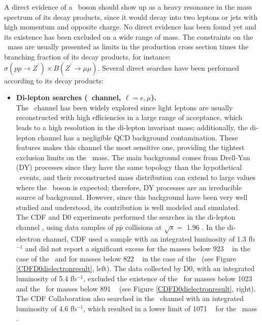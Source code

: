\noindent A direct evidence of a \Zprime~boson should show up as a heavy resonance in 
the mass spectrum of its decay products, since it would decay into two leptons or jets
with high momentum and opposite charge. No direct evidence has 
been found yet and its existence has been excluded on a wide range of mass. The constraints 
on the \Zprime~mass are usually presented as limits in the production cross section
times the branching fraction of its decay products, for instance: $\sigma ( pp \rightarrow Z^{\prime})\times B(Z^{\prime} \rightarrow \mu\mu)$. Several 
direct searches have been performed according to its decay products:

\begin{itemize}
 \item \textbf{Di-lepton searches (\Zprimetoll~channel, $\ell=e, \mu$).}\\

\noindent The \Zprimetoll~channel has been widely explored since light leptons
are usually reconstructed with high efficiencies in a large range of acceptance, which leads
to a high resolution in the di-lepton invariant mass; additionally, the di-lepton channel
has a negligible QCD background contamination. These features makes this channel the most 
sensitive one, providing the tightest exclusion limits on the \Zprime~mass. The main background comes 
from Drell-Yan (DY) processes since they have the same topology than the 
hypothetical \Zprime~events, and their reconstructed mass distribution can extend to large values where the
\Zprime~boson is expected; therefore, DY processes are an irreducible source of background. However, since 
this background have been very well studied and understood, its contribution is well modeled and simulated. \\

\noindent The CDF and D0 experiments performed the searches in the di-lepton
channel \cite{CDFZprimedielectronbib,CDFZprimedimuonbib,D0Zprimetodielectronbib},
using data samples of $p\bar{p}$ collisions at $\sqrt{s}=$ 1.96 \TeV. In the di-electron 
channel, CDF used a sample with an integrated luminosity of 1.3 fb$^{-1}$ and did not report a 
significant excess for the masses below 923 \GeV~ in the case of the \ZprimeSSM~and for masses below 822 \GeV~ 
in the case of the \Zprimepsi~(see Figure \ref{CDFD0dielectronresult}, left). The data collected by D0, with 
an integrated luminosity of 5.4 fb$^{-1}$, excluded the existence of the \ZprimeSSM~for masses below 1023 \GeV~
and the \Zprimepsi~for masses below 891 \GeV~ (see Figure \ref{CDFD0dielectronresult}, right). The CDF Collaboration 
also searched in the \Zprimetomumu~channel with an integrated luminosity of 4.6 fb$^{-1}$, which 
resulted in a lower limit of 1071 \GeV~ for the \ZprimeSSM~mass \cite{CDFZprimedimuonbib}. \\


\end{itemize}
